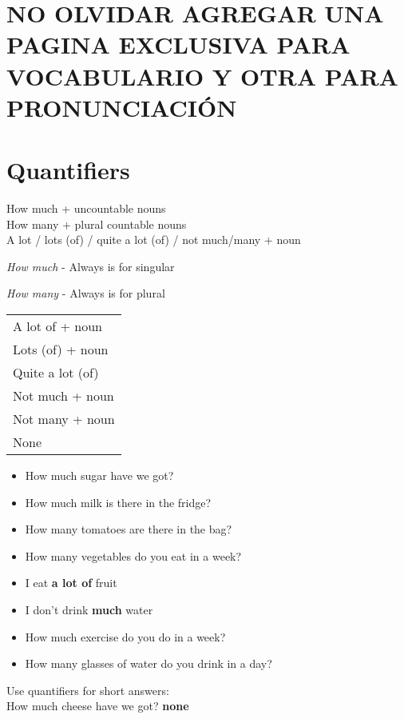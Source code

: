 \documentclass{elegantbook}
\begin{document}
        \section{NO OLVIDAR AGREGAR UNA PAGINA EXCLUSIVA PARA VOCABULARIO Y OTRA PARA PRONUNCIACIÓN}
        \section{Quantifiers}
        \begin{corollary}{}{}
            How much + uncountable nouns\\
            How many + plural countable nouns\\
            A lot / lots (of) / quite a lot (of) / not much/many + noun
        \end{corollary}
        \begin{property}
            \emph{How much} - Always is for singular
        \end{property}
        \begin{property}
            \emph{How many} - Always is for plural
        \end{property}
        \vspace{0.5em}
        \begin{tabular}{|l|}
            \hline
            A lot of + noun\\
            Lots (of) +  noun\\
            Quite a lot (of)\\
            Not much +  noun\\
            Not many + noun\\
            None\\
            \hline
        \end{tabular}
        \newpage
        \begin{example}
            \begin{itemize}
                \item How much sugar have we got?
                \item How much milk is there in the fridge?
                \item How many tomatoes are there in the bag?
                \item How many vegetables do you eat in a week?
                \item I eat \textbf{a lot of }fruit
                \item I don't drink \textbf{much} water
                \item How much exercise do you do in a week?
                \item How many glasses of water do you drink in a day?
            \end{itemize}
        \end{example}
        \begin{note}
            Use quantifiers for short answers:\\
            How much cheese have we got? \textbf{none}
        \end{note}





        
\end{document}
